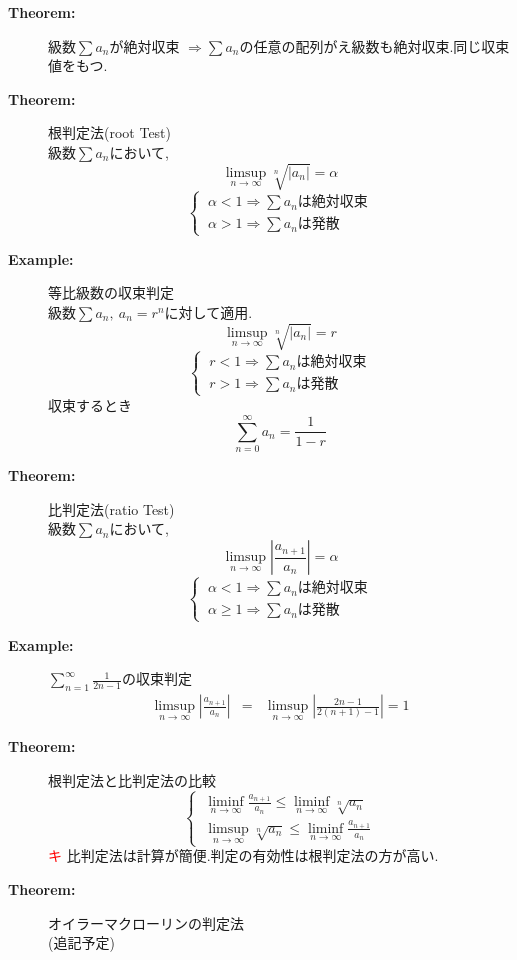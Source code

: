 \documentclass[dvipdfmx]{jsarticle}
\newcommand{\point}{\textcircled{\textcolor{red}{\scriptsize キ}} }
\begin{document}
\begin{description}
    \item[\bf{Theorem:}] 級数$\sum a_n$が絶対収束 $\Rightarrow \sum a_n$の任意の配列がえ級数も絶対収束.同じ収束値をもつ.
        
    \item[\bf{Theorem:}] 根判定法(root Test) \\
        級数$\sum a_n$において, 
        $$\limsup_{n \to \infty} \sqrt[n]{|a_n|} = \alpha$$
        $$ \begin{cases} \ \alpha < 1 \Rightarrow \sum a_{n} \text{は絶対収束} \\ 
        \ \alpha > 1 \Rightarrow \sum a_{n} \text{は発散} \end{cases} $$
    
    \item[\bf{Example:}] 等比級数の収束判定 \\
        級数$\sum a_n,\ a_n = r^n $に対して適用.
        $$ \limsup_{n \to \infty} \sqrt[n]{|a_n|} = r $$
        $$\begin{cases} \ r < 1 \Rightarrow \sum a_{n} \text{は絶対収束} \\ 
        \ r > 1 \Rightarrow \sum a_{n} \text{は発散} \end{cases} $$
        収束するとき
        $$ \sum_{n=0}^{\infty} a_n = \frac{1}{1-r}$$
        
    \item[\bf{Theorem:}] 比判定法(ratio Test) \\
        級数$\sum a_n$において, 
        $$ \limsup_{n \to \infty} |\frac{a_{n+1}}{a_n}| = \alpha $$
        $$ \begin{cases} \ \alpha < 1 \Rightarrow \sum a_{n} \text{は絶対収束} \\
            \ \alpha \geq 1 \Rightarrow \sum a_{n} \text{は発散} \end{cases} $$

    \item[\bf{Example:}] $\displaystyle \sum_{n=1}^{\infty} \frac{1}{2n-1}$の収束判定 
        \begin{eqnarray*}
            \limsup_{n \to \infty} |\frac{a_{n+1}}{a_n}| &=& \limsup_{n \to \infty} |\frac{2n-1}{2(n+1)-1}| = 1
        \end{eqnarray*}

    \item[\bf{Theorem:}] 根判定法と比判定法の比較
        $$ \begin{cases} \ \displaystyle { \liminf_{n \to \infty}  \frac{a_{n+1}}{a_n} \leq \liminf_{n \to \infty} \sqrt[n]{a_n} } \\ 
        \ \displaystyle { \limsup_{n \to \infty} \sqrt[n]{a_n} \leq \liminf_{n \to \infty} \frac{a_{n+1}}{a_n} } \end{cases} $$
    \point 比判定法は計算が簡便.判定の有効性は根判定法の方が高い.

    
    \item[\bf{Theorem:}] オイラーマクローリンの判定法 \\
        (追記予定)
\end{description}
\end{document}
